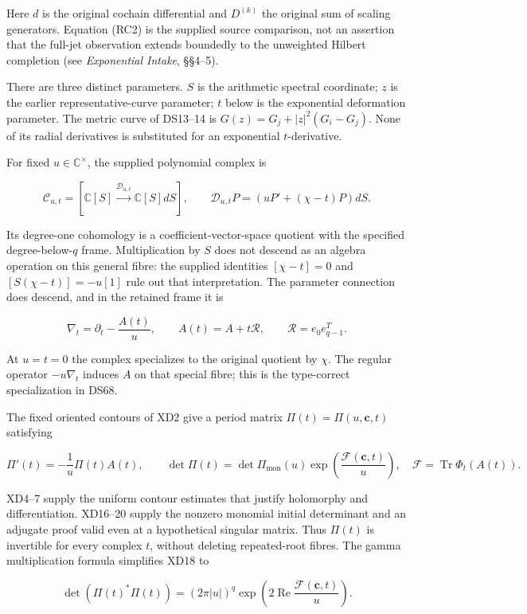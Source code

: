 Here \(d\) is the original cochain differential and \(D^{(k)}\) the original sum of scaling generators. Equation (RC2) is the supplied source comparison, not an assertion that the full-jet observation extends boundedly to the unweighted Hilbert completion (see \emph{Exponential Intake}, §§4--5).

There are three distinct parameters. \(S\) is the arithmetic spectral coordinate; \(z\) is the earlier representative-curve parameter; \(t\) below is the exponential deformation parameter. The metric curve of DS13--14 is \(G(z)=G_j+|z|^2(G_i-G_j)\). None of its radial derivatives is substituted for an exponential \(t\)-derivative.

For fixed \(u\in\mathbb C^\times\), the supplied polynomial complex is

\[
\mathcal C_{u,t}=
[\mathbb C[S]\xrightarrow{\mathcal D_{u,t}}\mathbb C[S]dS],
\qquad \mathcal D_{u,t}P=(uP'+(\chi-t)P)dS.
\tag{RC3}
\]

Its degree-one cohomology is a coefficient-vector-space quotient with the specified degree-below-\(q\) frame. Multiplication by \(S\) does not descend as an algebra operation on this general fibre: the supplied identities \([\chi-t]=0\) and \([S(\chi-t)]=-u[1]\) rule out that interpretation. The parameter connection does descend, and in the retained frame it is

\[
\nabla_t=\partial_t-\frac{A(t)}u,\qquad
A(t)=A+t\mathcal R,\qquad
\mathcal R=e_0e_{q-1}^{T}.
\tag{RC4}
\]

At \(u=t=0\) the complex specializes to the original quotient by \(\chi\). The regular operator \(-u\nabla_t\) induces \(A\) on that special fibre; this is the type-correct specialization in DS68.

The fixed oriented contours of XD2 give a period matrix \(\Pi(t)=\Pi(u,\mathbf c,t)\) satisfying

\[
\Pi'(t)=-\frac1u\Pi(t)A(t),\qquad
\det\Pi(t)=\det\Pi_{\mathrm{mon}}(u)
\exp\left(\frac{\mathcal F(\mathbf c,t)}u\right),
\quad \mathcal F=\operatorname{Tr}\Phi_t(A(t)).
\tag{RC5}
\]

XD4--7 supply the uniform contour estimates that justify holomorphy and differentiation. XD16--20 supply the nonzero monomial initial determinant and an adjugate proof valid even at a hypothetical singular matrix. Thus \(\Pi(t)\) is invertible for every complex \(t\), without deleting repeated-root fibres. The gamma multiplication formula simplifies XD18 to

\[
\det(\Pi(t)^*\Pi(t))=(2\pi|u|)^q
\exp\left(2\operatorname{Re}\frac{\mathcal F(\mathbf c,t)}u\right).
\tag{RC6}
\]

